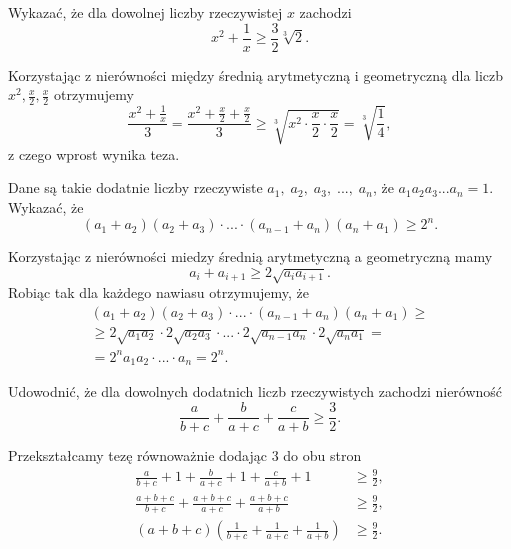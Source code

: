 \newpage
{}

\begin{problem}{1} 
	Wykazać, że dla dowolnej liczby rzeczywistej $x$ zachodzi
	\[
		x^2 + \frac{1}{x} \geqslant \frac{3}{2}\sqrt[3]{2}.
	\]
\end{problem}

\vspace{5px}

\noindent
Korzystając z nierówności między średnią arytmetyczną i geometryczną dla liczb $x^2, \frac{x}{2}, \frac{x}{2}$ otrzymujemy
\[
	\frac{x^2 + \frac{1}{x}}{3} = \frac{x^2 + \frac{x}{2} + \frac{x}{2}}{3} \geqslant \sqrt[3]{x^2 \cdot \frac{x}{2} \cdot \frac{x}{2}} = \sqrt[3]{\frac{1}{4}},
\]
z czego wprost wynika teza.

\vspace{5px}

\begin{problem}{2} 
	Dane są takie dodatnie liczby rzeczywiste $a_1, \;a_2,\; a_3,\; ...,\; a_n$, że $a_1a_2a_3...a_n = 1$. Wykazać, że
	\[
		(a_1 + a_2)(a_2 + a_3)\cdot ... \cdot (a_{n-1} + a_n)(a_n + a_1) \geqslant 2^n.
	\]
\end{problem}

\vspace{5px}

\noindent
Korzystając z nierówności miedzy średnią arytmetyczną a geometryczną mamy
\[
	a_i + a_{i + 1} \geqslant 2\sqrt{a_ia_{i + 1}}.
\]
Robiąc tak dla każdego nawiasu otrzymujemy, że
\begin{multline*}
	(a_1 + a_2)(a_2 + a_3)\cdot ... \cdot (a_{n-1} + a_n)(a_n + a_1) \geqslant \\
	\geqslant 2\sqrt{a_1a_{2}} \cdot 2\sqrt{a_2a_{3}} \cdot ... \cdot 2\sqrt{a_{n-1}a_{n}}\cdot 2\sqrt{a_na_{1}}  = \\
	= 2^n a_1a_2\cdot ... \cdot a_n = 2^n.
\end{multline*}

\begin{problem}{3} 
	Udowodnić, że dla dowolnych dodatnich liczb rzeczywistych zachodzi nierówność
	\[
		\frac{a}{b + c} + \frac{b}{a + c} + \frac{c}{a + b} \geqslant \frac{3}{2}.
	\]
\end{problem}

\vspace{5px}

\noindent
Przekształcamy tezę równoważnie dodając $3$ do obu stron
\begin{align*}
	\frac{a}{b + c} + 1 + \frac{b}{a + c} + 1 + \frac{c}{a + b} + 1 &\geqslant \frac{9}{2}, \\
	\frac{a + b + c}{b + c} + \frac{a + b + c}{a + c} + \frac{a + b + c}{a + b} &\geqslant \frac{9}{2}, \\
	\left(a + b + c\right)\left(\frac{1}{b + c} + \frac{1}{a + c} + \frac{1}{a + b}\right) &\geqslant \frac{9}{2}.
\end{align*}


